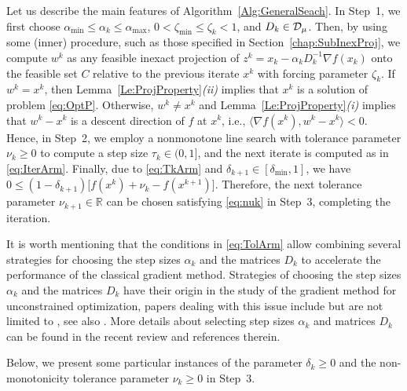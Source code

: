 Let us describe the main features of Algorithm~\ref{Alg:GeneralSeach}. In Step~1,  we first  choose   $\alpha_{\min}\leq \alpha_k \leq \alpha_{\max}$, $0 < \zeta_{\min} \leq \zeta_k  < 1$, and  $D_k\in  {\cal D}_{\mu}$. Then, by using some (inner) procedure, such as those specified in Section~\ref{chap:SubInexProj}, we compute $w^k$ as any feasible inexact projection of $z^k = x_k - \alpha_kD_k^{-1}\nabla f(x_k)$ onto the feasible set $C$ relative to the previous iterate $x^k$ with forcing parameter $\zeta_k$. If $w^k= x^k$, then Lemma~\ref{Le:ProjProperty}{\it (ii)} implies that $x^{k}$ is a solution of  problem \eqref{eq:OptP}.  Otherwise,  $w^k\neq  x^k$ and Lemma~\ref{Le:ProjProperty}{\it (i)}  implies  that $ w^k- x^k$ is a descent direction of $f$ at $x^k$, i.e.,  $\langle \nabla f(x^k), w^k- x^k \rangle < 0$.    Hence, in Step~2, we employ a nonmonotone line search  with tolerance parameter $\nu_k\geq 0$ to compute a step size  $\tau_k \in (0, 1]$,  and  the next iterate is computed as in \eqref{eq:IterArm}. Finally, due to  \eqref{eq:TkArm} and  $\delta_{k+1}\in [\delta_{\min}, 1]$, we have $0\leq (1-\delta_{k+1})\big[f(x^{k})+\nu_{k}-  f(x^{k+1})\big]$.  Therefore, the next   tolerance parameter $\nu_{k+1}\in {\mathbb R}$ can be chosen satisfying \eqref{eq:nuk}  in Step~3, completing the iteration.

It is worth mentioning that the conditions in \eqref{eq:TolArm}  allow combining several strategies for choosing the step sizes $\alpha_k$  and the matrices $D_k$  to accelerate the performance of the classical gradient method.   Strategies  of choosing the step sizes $\alpha_k$  and the matrices $D_k$ have their origin in the study of the gradient  method  for unconstrained  optimization,  papers dealing with this issue include  but are not limited to \cite{BB1988, DaiHage2006, Serafino2018, Friedlander1999, Dai2006}, see also  \cite{BonettiniPrato2015, DaiFletcher2005, DaiFletcher2006, Polyak_Levitin1966}. More details  about   selecting  step sizes $\alpha_k$  and matrices $D_k$  can be found in the recent  review  \cite{bonettini2019recent} and  references therein.


Below, we present some  particular instances  of the parameter   $\delta_k\geq 0$ and  the non-monotonicity tolerance parameter $ \nu_ {k} \geq 0$  in Step~3.

